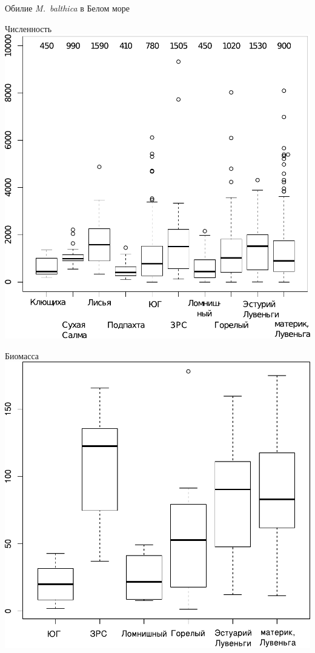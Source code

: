 \documentclass{beamer}
\begin{document}
\begin{frame}{Обилие {\it M.~balthica} в Белом море}
	\begin{minipage}[t]{.49\linewidth}
		\begin{center}
		{\footnotesize Численность}
			\includegraphics[width=\textwidth]{N2_area_White1.pdf}
		\end{center}
	\end{minipage}
%
	\begin{minipage}[t]{.49\linewidth}
		\begin{center}
		{\footnotesize Биомасса}
			\includegraphics[width=\textwidth]{B_Kanda_ru1.pdf}
		\end{center}
	\end{minipage}


\end{frame}
\end{document}
